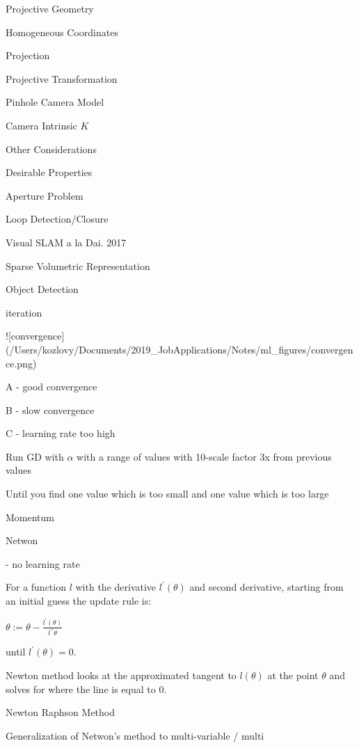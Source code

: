 \begin{section}
\begin{subsubsection}
\begin{subsubsection}
\begin{subsubsection}
\begin{section}{Projective Geometry}
\begin{subsection}{Homogeneous Coordinates}
\begin{subsubsection}
{\begin{subsubsection}{Projection}
\begin{subsubsection}{Projective Transformation}
\begin{subsection}
\begin{subsubsection}
\begin{subsubsection}
\begin{subsubsection}
{\begin{subsubsection}
\begin{subsection}
\begin{subsection} {Pinhole Camera Model}
\begin{subsection} {Camera Intrinsic $K$}
\begin{subsection}
\begin{subsection}
\begin{subsubsection}{Other Considerations}
{\begin{subsection}
\begin{subsubsection}{Desirable Properties}
\begin{section}
\begin{subsection}
\begin{subsection}
\begin{subsection}
\begin{section}
\begin{subsection}
\begin{subsubsection}
\begin{subsubsection}
\begin{subsection}
\begin{section}
\begin{subsection}
\begin{subsubsection}{Aperture Problem}
\begin{subsubsection}
{\begin{section}
\begin{subsubsection}
\begin{subsubsection}
\begin{subsubsection}
\begin{subsection}
\begin{subsection}
\begin{subsection}
\begin{subsection}
\begin{subsection}
\begin{subsection}
\begin{subsection}
\begin{subsubsection}
{\begin{subsubsection}
{\begin{subsubsection}
\begin{section}
\begin{section}
\begin{section}
\begin{subsubsection}
\begin{subsubsection}{Loop Detection/Closure}
\begin{subsubsection}{Visual SLAM a la Dai. 2017}
\begin{subsubsection}{Sparse Volumetric Representation}
\begin{subsection}
\begin{section}{Object Detection}
\begin{subsubsection}
{\begin{subsection}
\begin{subsection}
\begin{section}
\begin{section}
\begin{subsection}
\begin{subsubsection}
\begin{subsubsection}
\begin{subsection}
\begin{subsection}
iteration

![convergence](/Users/kozlovy/Documents/2019_JobApplications/Notes/ml_figures/convergence.png)

A - good convergence

B - slow convergence

C - learning rate too high

Run GD with $\alpha$ with a range of values with 10-scale factor  3x from previous values

Until you find one value which is too small and one value which is too large

\begin{subsubsection} Momentum

\begin{subsubsection} Netwon

- no learning rate

For a function $l$ with the derivative $l^\prime(\theta)$ and second derivative, starting from an initial guess the update rule is:

$\theta := \theta - \frac{l^\prime(\theta)}{l^{\prime\prime}\theta}$

until $l^\prime(\theta)=0$. 

Newton method looks at the approximated tangent to $l(\theta)$ at the point $\theta$ and solves for where the line is equal to 0.

\begin{subsubsection}{ Newton Raphson Method

Generalization of Netwon's method to multi-variable / multi }
\end{subsubsection}
\end{subsubsection}
\end{subsubsection}
\end{subsection}
\end{subsection}
\end{subsubsection}
\end{subsubsection}
\end{subsection}
\end{section}
\end{section}
\end{subsection}
\end{subsection}}
\end{subsubsection}
\end{section}
\end{subsection}
\end{subsubsection}
\end{subsubsection}
\end{subsubsection}
\end{subsubsection}
\end{section}
\end{section}
\end{section}
\end{subsubsection}}
\end{subsubsection}}
\end{subsubsection}
\end{subsection}
\end{subsection}
\end{subsection}
\end{subsection}
\end{subsection}
\end{subsection}
\end{subsection}
\end{subsubsection}
\end{subsubsection}
\end{subsubsection}
\end{section}}
\end{subsubsection}
\end{subsubsection}
\end{subsection}
\end{section}
\end{subsection}
\end{subsubsection}
\end{subsubsection}
\end{subsection}
\end{section}
\end{subsection}
\end{subsection}
\end{subsection}
\end{section}
\end{subsubsection}
\end{subsection}}
\end{subsubsection}
\end{subsection}
\end{subsection}
\end{subsection}
\end{subsection}
\end{subsection}
\end{subsubsection}}
\end{subsubsection}
\end{subsubsection}
\end{subsubsection}
\end{subsection}
\end{subsubsection}
\end{subsubsection}}
\end{subsubsection}
\end{subsection}
\end{section}
\end{subsubsection}
\end{subsubsection}
\end{subsubsection}
\end{section}
